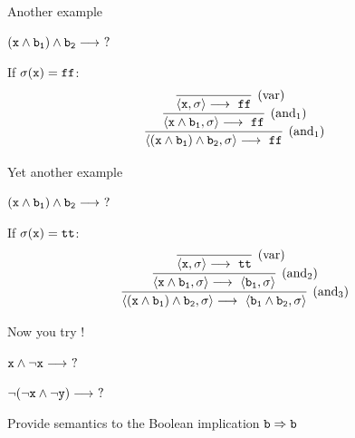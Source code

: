 \documentclass{beamer}
\begin{document}
\begin{frame}{Another example}

        $(\mathtt{x} \wedge \mathtt{b_1}) \wedge \mathtt{b_2} \longrightarrow\ ?$

        \centering
        \bigskip
        If $\sigma(\mathtt{x}) = \mathtt{ff}$:
        \smallskip
        \[
                \infer[(\text{and$_1$})]{
                        \pv{(\prog{x} \wedge \prog{b_1}) \wedge
                        \prog{b_2}}{\sigma} \longrightarrow\ \prog{ff} 
                }{
                        \infer[(\text{and$_1$})]{
                                \pv{\prog{x} \wedge \prog{b_1}}{\sigma} 
                                \longrightarrow\ \prog{ff}
                        }{
                                \infer[(\text{var})]{ 
                                        \pv{\prog{x}}{\sigma} \longrightarrow\  \prog{ff}
                                }{
                                }
                        }
                }
        \]

\end{frame}

\begin{frame}{Yet another example}

        $(\mathtt{x} \wedge \mathtt{b_1}) \wedge \mathtt{b_2} \longrightarrow\ ?$

        \centering
        \bigskip
        If $\sigma(\mathtt{x}) = \mathtt{tt}$:
        \smallskip
        \[
                \infer[(\text{and$_3$})]{
                        \pv{(\prog{x} \wedge \prog{b_1}) \wedge
                        \prog{b_2}}{\sigma} \longrightarrow\ 
                        \pv{\prog{b_1} \wedge \prog{b_2}}{\sigma}
                }{
                        \infer[(\text{and$_2$})]{
                                \pv{\prog{x} \wedge \prog{b_1}}{\sigma} 
                                \longrightarrow\ \pv{\prog{b_1}}{\sigma}
                        }{
                                \infer[(\text{var})]{ 
                                        \pv{\prog{x}}{\sigma} \longrightarrow\  \prog{tt}
                                }{
                                }
                        }
                }
        \]

\end{frame}

\begin{frame}{Now you try !}

        $\mathtt{x} \wedge \neg \mathtt{x} \longrightarrow\ ?$

        $\neg (\neg \mathtt{x} \wedge \neg \mathtt{y}) \longrightarrow\ ?$

        \bigskip
        Provide semantics to the Boolean implication $\mathtt{b} \Rightarrow
        \mathtt{b}$
\end{frame}
\end{document}
